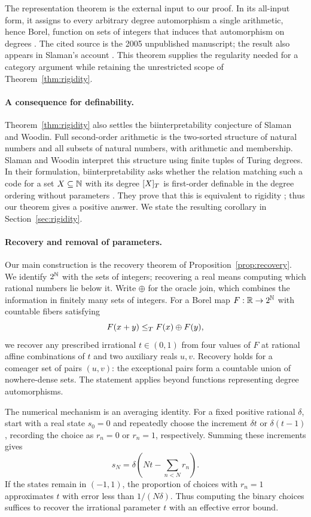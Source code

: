 The representation theorem is the external input to our proof.
In its all-input form, it assigns to every arbitrary degree
automorphism a single arithmetic, hence Borel, function on sets of
integers that induces that automorphism on degrees
\cite[Theorem~6.3.1(2)]{SlamanWoodin2005}. The cited source is the
2005 unpublished manuscript; the result also appears in Slaman's
account \cite{SlamanGlobal}. This theorem supplies the regularity
needed for a category argument while retaining the unrestricted
scope of Theorem~\ref{thm:rigidity}.

\paragraph{A consequence for definability.}
Theorem~\ref{thm:rigidity} also settles the biinterpretability
conjecture of Slaman and Woodin. Full second-order arithmetic is
the two-sorted structure of natural numbers and all subsets of
natural numbers, with arithmetic and membership. Slaman and Woodin
interpret this structure using finite tuples of Turing degrees.
In their formulation, biinterpretability asks whether the relation
matching such a code for a set $X\subseteq\mathbb N$ with its degree
$[X]_T$ is first-order definable in the degree ordering without
parameters \cite[Definition~7.5.1]{SlamanWoodin2005}.
They prove that this is equivalent to rigidity
\cite[Theorem~7.5.3]{SlamanWoodin2005}; thus our theorem gives a
positive answer. We state the resulting corollary in
Section~\ref{sec:rigidity}.

\paragraph{Recovery and removal of parameters.}
Our main construction is the recovery theorem of
Proposition~\ref{prop:recovery}. We identify $2^\mathbb N$ with the sets of
integers; recovering a real means computing which rational numbers
lie below it. Write $\oplus$ for the oracle join,
which combines the information in finitely many sets of integers.
For a Borel map $F:\mathbb R\to2^\mathbb N$ with countable fibers satisfying
\[
F(x+y)\le_T F(x)\oplus F(y),
\]
we recover any prescribed irrational $t\in(0,1)$ from four values
of $F$ at rational affine combinations of $t$ and two auxiliary
reals $u,v$. Recovery holds for a comeager set of pairs $(u,v)$:
the exceptional pairs form a countable union of nowhere-dense
sets. The statement applies beyond functions representing degree
automorphisms.

The numerical mechanism is an averaging identity. For a fixed
positive rational $\delta$, start with a real state $s_0=0$
and repeatedly choose the increment $\delta t$ or
$\delta(t-1)$, recording the choice as $r_n=0$ or $r_n=1$,
respectively. Summing these increments gives
\[
s_N=\delta\left(Nt-\sum_{n<N}r_n\right).
\]
If the states remain in $(-1,1)$, the proportion of choices with
$r_n=1$ approximates $t$ with error less than $1/(N\delta)$.
Thus computing the binary choices suffices to recover the
irrational parameter $t$ with an effective error bound.

